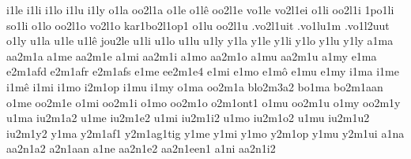 {%
i1le
i1li
i1lo
i1lu
i1ly
%
o1la
oo2l1a
o1le
o1lê
oo2l1e
vo1le
vo2l1ei
o1li
oo2l1i
1po1li
so1li
o1lo
oo2l1o
vo2l1o
kar1bo2l1op1
o1lu
oo2l1u
.vo2l1uit
.vo1lu1m
.vo1l2uut
o1ly
%
u1la
u1le
u1lê
jou2le
u1li
u1lo
u1lu
u1ly
%
y1la
y1le
y1li
y1lo
y1lu
y1ly
%
%
a1ma
aa2m1a
a1me
aa2m1e
a1mi
aa2m1i
a1mo
aa2m1o
%
a1mu
aa2m1u
a1my
%
e1ma
e2m1afd
e2m1afr
e2m1afs
e1me
ee2m1e4
e1mi
e1mo
e1mô
e1mu
e1my
%
i1ma
i1me
i1mê
i1mi
i1mo
i2m1op
i1mu
i1my
%
o1ma
oo2m1a
blo2m3a2
bo1ma
bo2m1aan
o1me
oo2m1e
o1mi
oo2m1i
o1mo
oo2m1o
o2m1ont1
o1mu
oo2m1u
o1my
oo2m1y
%
u1ma
iu2m1a2
u1me
iu2m1e2
u1mi
iu2m1i2
u1mo
iu2m1o2
u1mu
iu2m1u2
iu2m1y2
%
%
y1ma
y2m1af1
y2m1ag1tig
y1me
y1mi
y1mo
y2m1op
y1mu
y2m1ui
%
%
a1na
aa2n1a2
a2n1aan
a1ne
aa2n1e2
aa2n1een1
a1ni
aa2n1i2
}
